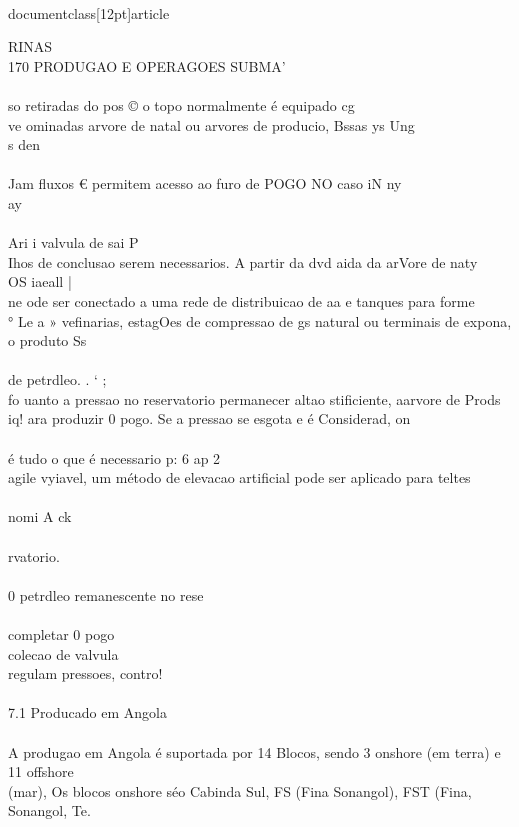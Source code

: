 \\documentclass[12pt]{article}
\begin{document}
RINAS\\
170 PRODUGAO E OPERAGOES SUBMA'\\
\\
so retiradas do pos © o topo normalmente é equipado cg\\
ve ominadas arvore de natal ou arvores de producio, Bssas ys Ung\\
s den\\
\\
Jam fluxos € permitem acesso ao furo de POGO NO caso iN ny\\
ay\\
\\
Ari i valvula de sai P\\
Ihos de conclusao serem necessarios. A partir da dvd aida da arVore de naty\\
OS iaeall |\\
ne ode ser conectado a uma rede de distribuicao de aa e tanques para forme\\
° Le a » vefinarias, estagOes de compressao de gs natural ou terminais de expona,\\
o produto Ss\\
\\
de petrdleo. . ‘ ;\\
fo uanto a pressao no reservatorio permanecer altao stificiente, aarvore de Prods\\
iq! ara produzir 0 pogo. Se a pressao se esgota e é Considerad, on\\
\\
é tudo o que é necessario p: 6 ap 2\\
agile vyiavel, um método de elevacao artificial pode ser aplicado para teltes\\
\\
nomi A ck\\
\\
rvatorio.\\
\\
0 petrdleo remanescente no rese\\
\\
completar 0 pogo\\
colecao de valvula\\
regulam pressoes, contro!\\
\\
7.1 Producado em Angola\\
\\
A produgao em Angola é suportada por 14 Blocos, sendo 3 onshore (em terra) e 11 offshore\\
(mar), Os blocos onshore séo Cabinda Sul, FS (Fina Sonangol), FST (Fina, Sonangol, Te.\\
\end{document}
